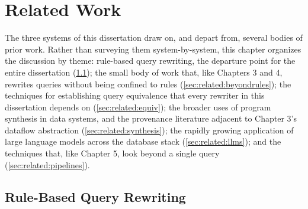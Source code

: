 \chapter{Related Work}
\label{chap:related}

The three systems of this dissertation draw on, and depart from,
several bodies of prior work. Rather than surveying them
system-by-system, this chapter organizes the discussion by theme:
rule-based query rewriting, the departure point for the entire
dissertation (\cref{sec:related:rules}); the small body of work that,
like Chapters 3 and 4, rewrites queries without being confined to
rules (\cref{sec:related:beyondrules}); the techniques for
establishing query equivalence that every rewriter in this
dissertation depends on (\cref{sec:related:equiv}); the broader uses
of program synthesis in data systems, and the provenance literature
adjacent to Chapter 3's dataflow abstraction
(\cref{sec:related:synthesis}); the rapidly growing application of
large language models across the database stack
(\cref{sec:related:llms}); and the techniques that, like Chapter 5,
look beyond a single query (\cref{sec:related:pipelines}).

\section{Rule-Based Query Rewriting}
\label{sec:related:rules}
\label{slab:sec:related}

